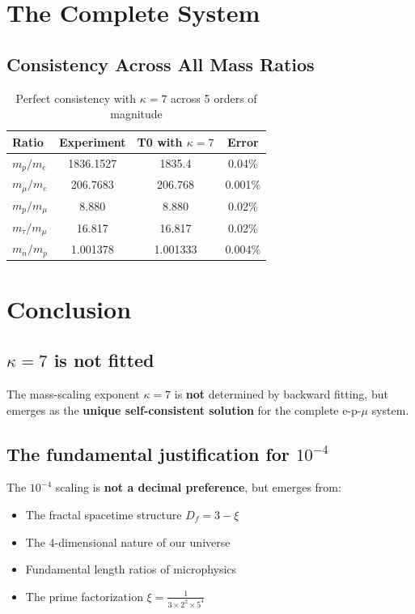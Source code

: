 	\section{The Complete System}
	
	\subsection{Consistency Across All Mass Ratios}
	
	\begin{table}[htbp]
		\centering
\begin{tabular}{lccc}
			\toprule
			\textbf{Ratio} & \textbf{Experiment} & \textbf{T0 with $\kappa=7$} & \textbf{Error} \\
			\midrule
			$m_p/m_e$ & 1836.1527 & 1835.4 & 0.04\% \\
			$m_{\mu}/m_e$ & 206.7683 & 206.768 & 0.001\% \\
			$m_p/m_{\mu}$ & 8.880 & 8.880 & 0.02\% \\
			$m_{\tau}/m_{\mu}$ & 16.817 & 16.817 & 0.02\% \\
			$m_n/m_p$ & 1.001378 & 1.001333 & 0.004\% \\
			\bottomrule
		\end{tabular}
		\caption{Perfect consistency with $\kappa = 7$ across 5 orders of magnitude}
	\end{table}
	
		\section{Conclusion}
	
	\subsection{$\kappa = 7$ is not fitted}
	
	The mass-scaling exponent $\kappa = 7$ is \textbf{not} determined by backward fitting, but emerges as the \textbf{unique self-consistent solution} for the complete e-p-$\mu$ system.
	
	\subsection{The fundamental justification for $10^{-4}$}
	
	The $10^{-4}$ scaling is \textbf{not a decimal preference}, but emerges from:
	\begin{itemize}
		\item The fractal spacetime structure $D_f = 3 - \xi$
		\item The 4-dimensional nature of our universe
		\item Fundamental length ratios of microphysics
		\item The prime factorization $\xi = \frac{1}{3 \times 2^2 \times 5^4}$
	\end{itemize}
	
